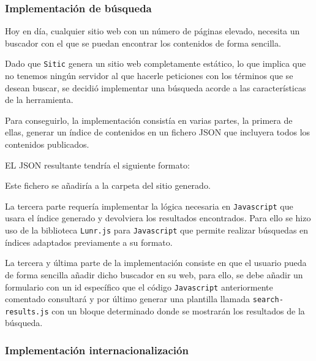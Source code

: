 \subsubsection{Implementación de búsqueda}

Hoy en día, cualquier sitio web con un número de páginas elevado, necesita un
buscador con el que se puedan encontrar los contenidos de forma sencilla.

Dado que \texttt{Sitic} genera un sitio web completamente estático, lo que implica que no tenemos ningún
servidor al que hacerle peticiones con los términos que se desean buscar, se decidió implementar
una búsqueda acorde a las características de la herramienta.

Para conseguirlo, la implementación consistía en varias partes, la primera de ellas, generar un índice de contenidos
en un fichero JSON que incluyera todos los contenidos publicados.

EL JSON resultante tendría el siguiente formato:

\begin{jsoncode}
\end{jsoncode}

Este fichero se añadiría a la carpeta del sitio generado.

La tercera parte requería implementar la lógica necesaria en \texttt{Javascript} que usara el índice generado
y devolviera los resultados encontrados. Para ello se hizo uso de la biblioteca \texttt{Lunr.js} para
\texttt{Javascript} que permite realizar búsquedas en índices adaptados previamente a su formato.

La tercera y última parte de la implementación consiste en que el usuario pueda de forma sencilla añadir dicho buscador en
su web, para ello, se debe añadir un formulario con un id específico que el código \texttt{Javascript} anteriormente
comentado consultará y por último generar una plantilla llamada \texttt{search-results.js} con un bloque
determinado donde se mostrarán los resultados de la búsqueda.

\subsubsection{Implementación internacionalización}

